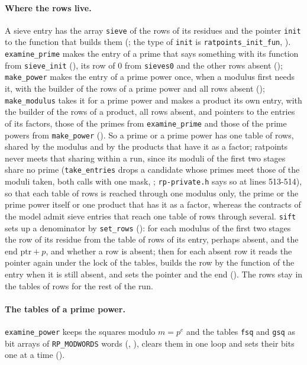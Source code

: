\paragraph{Where the rows live.} A sieve entry has the array \verb|sieve| of the rows of its
residues and the pointer \verb|init| to the function that builds them
(; the type of \verb|init| is \verb|ratpoints_init_fun|,
). \verb|examine_prime| makes the entry of a prime that says
something with its function from \verb|sieve_init| (), its row of
$0$ from \verb|sieves0| and the other rows absent ();
\verb|make_power| makes the entry of a prime power once, when a modulus first needs it, with the
builder of the rows of a prime power and all rows absent ();
\verb|make_modulus| takes it for a prime power and makes a product its own entry, with the builder
of the rows of a product, all rows absent, and pointers to the entries of its factors, those of the
primes from \verb|examine_prime| and those of the prime powers from \verb|make_power|
(). So a prime or a prime power has one table of rows, shared by
the modulus and by the products that have it as a factor; ratpoints never meets that sharing within
a run, since its moduli of the first two stages share no prime (\verb|take_entries| drops a
candidate whose primes meet those of the moduli taken, both calls with one mask,
; \verb|rp-private.h| says so at lines 513-514), so that each
table of rows is reached through one modulus only, the prime or the prime power itself or one
product that has it as a factor, whereas the contracts of the model admit sieve entries that reach
one table of rows through several. \verb|sift| sets up a denominator by \verb|set_rows|
(): for each modulus of the first two stages the row of its
residue from the table of rows of its entry, perhaps absent, and the end $\mathrm{ptr} + p$, and
whether a row is absent; then for each absent row it reads the pointer again under the lock of the
tables, builds the row by the function of the entry when it is still absent, and sets the pointer
and the end (). The rows stay in the tables of rows for the rest
of the run.

\paragraph{The tables of a prime power.} \verb|examine_power| keeps the squares modulo $m = p^e$ and
the tables \verb|fsq| and \verb|gsq| as bit arrays of \verb|RP_MODWORDS| words
(, ), clears them in one loop and
sets their bits one at a time ().

